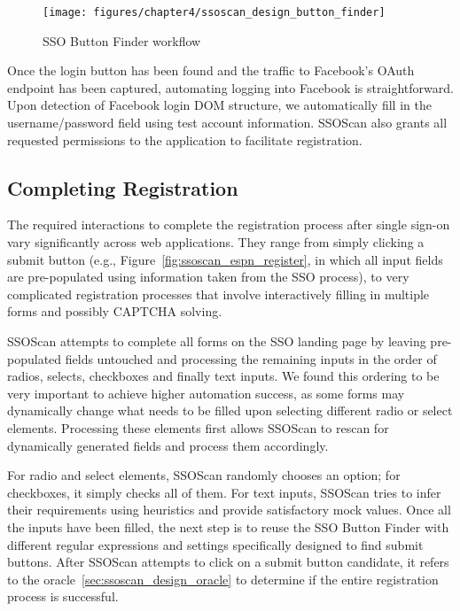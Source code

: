 \begin{figure}[hbt]
\centering
\texttt{[image: figures/chapter4/ssoscan\_design\_button\_finder]}
\caption{SSO Button Finder workflow}
\label{fig:ssoscan_design_button_finder}
\end{figure}

Once the login button has been found and the traffic to Facebook's OAuth endpoint has been captured, automating logging into Facebook is straightforward.  Upon detection of Facebook login DOM structure, we automatically fill in the username/password field using test account information.  SSOScan also grants all requested permissions to the application to facilitate registration.

\subsection{Completing Registration}
\label{sec:ssoscan_design_cr}

The required interactions to complete the registration process after single sign-on vary significantly across web applications.  They range from simply clicking a submit button (e.g., Figure~\ref{fig:ssoscan_espn_register}, in which all input fields are pre-populated using information taken from the SSO process), to very complicated registration processes that involve interactively filling in multiple forms and possibly CAPTCHA solving.

SSOScan attempts to complete all forms on the SSO landing page by leaving pre-populated fields untouched and processing the remaining inputs in the order of radios, selects, checkboxes and finally text inputs.  We found this ordering to be very important to achieve higher automation success, as some forms may dynamically change what needs to be filled upon selecting different radio or select elements.  Processing these elements first allows SSOScan to rescan for dynamically generated fields and process them accordingly.  

For radio and select elements, SSOScan randomly chooses an option; for checkboxes, it simply checks all of them.  For text inputs, SSOScan tries to infer their requirements using heuristics and provide satisfactory mock values.  Once all the inputs have been filled, the next step is to reuse the SSO Button Finder with different regular expressions and settings specifically designed to find submit buttons.  After SSOScan attempts to click on a submit button candidate, it refers to the oracle~\ref{sec:ssoscan_design_oracle} to determine if the entire registration process is successful.

